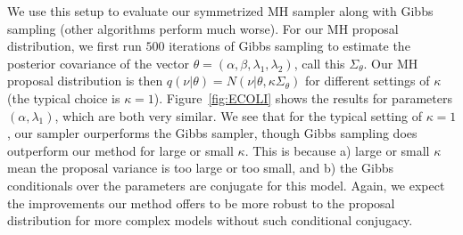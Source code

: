   We use this setup to evaluate our symmetrized MH sampler along with 
  Gibbs sampling (other algorithms perform much worse). For our MH proposal distribution, we first 
  run \sout{$500$}  iterations of Gibbs sampling to estimate the posterior 
  covariance of the vector $\theta = (\alpha,\beta,\lambda_1,\lambda_2)$, call this 
  $\Sigma_\theta$. Our MH proposal distribution is then $q(\nu|\theta) = 
  N(\nu|\theta, \kappa\Sigma_\theta)$ for different settings of 
  $\kappa$ (the typical choice is $\kappa = 1$). Figure~\ref{fig:ECOLI} 
  shows the results for parameters $(\alpha, \lambda_1)$, which are both 
  very similar. 
  We see that for the typical setting of $\kappa=1$, our 
  sampler ourperforms the Gibbs sampler, though Gibbs sampling does 
  outperform our method for large or small $\kappa$. This is because a) 
  large or small $\kappa$ mean the proposal variance is too large or too 
  small, and b) the Gibbs 
  conditionals over the parameters are conjugate for this model. Again,
  we expect the improvements our method offers to be more robust to the 
  proposal distribution for more complex models without such conditional 
  conjugacy.

